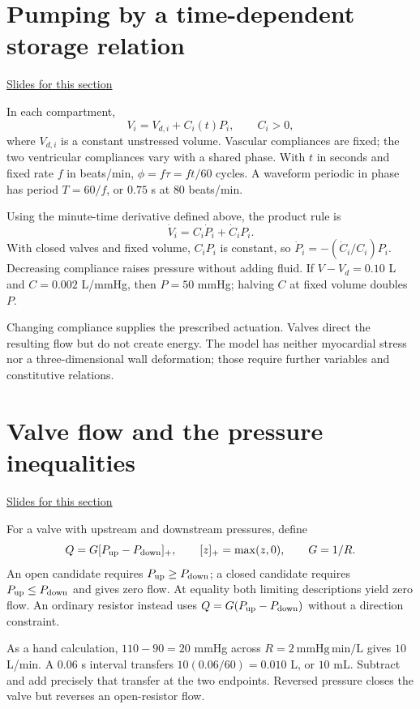 \documentclass[11pt,letterpaper]{article}
\theoremstyle{definition}\newtheorem{definition}{Definition}\newtheorem{example}{Example}
\numberwithin{equation}{section}
\begin{document}
\section{Pumping by a time-dependent storage relation}
\hypertarget{note-pumping-by-a-time-dependent-storage-relation}{}\label{note:pumping-by-a-time-dependent-storage-relation}
{\small \href{slides.html\#frame=shared-ventricular-phase\&step=1}{Slides for this section}}\par
In each compartment,
\[
V_i=V_{d,i}+C_i(t)P_i,\qquad C_i>0,
\]
where $V_{d,i}$ is a constant unstressed volume. Vascular compliances are fixed; the two ventricular compliances vary with a shared phase. With $t$ in seconds and fixed rate $f$ in beats/min, $\phi=f\tau=ft/60$ cycles. A waveform periodic in phase has period $T=60/f$, or $0.75$ s at $80$ beats/min.

Using the minute-time derivative defined above, the product rule is
\[
\dot V_i=C_i\dot P_i+\dot C_iP_i.
\]
With closed valves and fixed volume, $C_iP_i$ is constant, so $\dot P_i=-(\dot C_i/C_i)P_i$. Decreasing compliance raises pressure without adding fluid. If $V-V_d=0.10$ L and $C=0.002$ L/mmHg, then $P=50$ mmHg; halving $C$ at fixed volume doubles $P$.

Changing compliance supplies the prescribed actuation. Valves direct the resulting flow but do not create energy. The model has neither myocardial stress nor a three-dimensional wall deformation; those require further variables and constitutive relations.
\section{Valve flow and the pressure inequalities}
\hypertarget{note-valve-flow-and-the-pressure-inequalities}{}\label{note:valve-flow-and-the-pressure-inequalities}
{\small \href{slides.html\#frame=ideal-valve-inequalities\&step=1}{Slides for this section}}\par
For a valve with upstream and downstream pressures, define
\[
Q=G[P_{\rm up}-P_{\rm down}]_+,\qquad[z]_+=\max(z,0),\qquad G=1/R.
\]
An open candidate requires $P_{\rm up}\geq P_{\rm down}$; a closed candidate requires $P_{\rm up}\leq P_{\rm down}$ and gives zero flow. At equality both limiting descriptions yield zero flow. An ordinary resistor instead uses $Q=G(P_{\rm up}-P_{\rm down})$ without a direction constraint.

As a hand calculation, $110-90=20$ mmHg across $R=2\ \mathrm{mmHg}\,\mathrm{min}/\mathrm L$ gives $10$ L/min. A $0.06$ s interval transfers $10(0.06/60)=0.010$ L, or $10$ mL. Subtract and add precisely that transfer at the two endpoints. Reversed pressure closes the valve but reverses an open-resistor flow.
\end{document}
